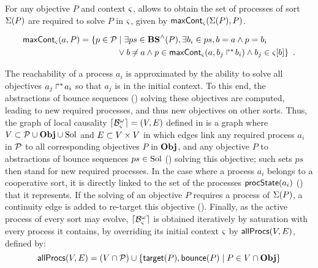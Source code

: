 For any objective $P$ and context $\varsigma$,  allows to obtain the set of processes of sort $\Sigma(P)$ are required to solve $P$ in $\varsigma$, given by $\mathsf{maxCont}_\varsigma(\Sigma(P), P)$.
\begin{definition}[$\gCont_\ctx : \Sigma \times \Obj \rightarrow \powerset(\PHproc)$]
  \label{def:maxCont}
  \begin{align*}
    \mathsf{maxCont}_\varsigma(a,P) = 
    \{ p \in \mathcal{P} &\mid \exists ps \in \mathbf{BS}^\wedge(P), \exists b_i \in ps, b = a \wedge p = b_i \\
      & \vee b \not\nobreak\mkern -2mu = a \wedge p \in \mathsf{maxCont}_\varsigma(a, \mbox{$b_j\Rsh^*\!b_i$}) \wedge b_j \in {\varsigma[b]} \}
    \enspace.
  \end{align*}
\end{definition}

The reachability of a process $a_i$ is approximated by the ability to solve all objectives $\mbox{${a}_{j}\Rsh^*\!{a}_{i}$}$ so that $a_j$ is in the initial context.
To this end, the abstractions of bounce sequences () solving these objectives are computed, leading to new required processes, and thus new objectives on other sorts.
Thus, the graph of local causality $\lceil \mathcal{B}_\varsigma^\omega\rceil = (V, E)$ defined in  is a graph where $V \subset \mathcal{P} \cup \mathbf{Obj} \cup \mathrm{Sol}$ and $E \subset V \times V$
in which edges link any required process $a_i$ in $\mathcal{P}$ to all corresponding objectives $P$ in $\mathbf{Obj}$,
and any objective $P$ to abstractions of bounce sequences $ps \in \mathrm{Sol}$ () solving this objective;
such sets $ps$ then stand for new required processes.
In the case where a process $a_i$ belongs to a cooperative sort, it is directly linked to the set of the processes $\mathsf{procState}(a_i)$ () that it represents.
If the solving of an objective $P$ requires a process of $\Sigma(P)$, a continuity edge is added to re-target this objective ().
Finally, as the active process of every sort may evolve, $\lceil \mathcal{B}_\varsigma^\omega\rceil$ is obtained iteratively by saturation with every process it contains,
\ie by overriding its initial context $\varsigma$ by $\mathsf{allProcs}(V, E)$, defined by:
$$\mathsf{allProcs}(V, E) = (V \cap \mathcal{P}) \cup \{ \mathsf{target}(P), \mathsf{bounce}(P) \mid P \in V \cap \mathbf{Obj} \}$$

